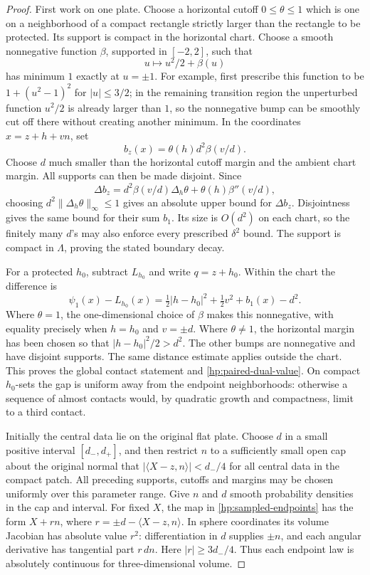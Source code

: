 \documentclass[11pt]{article}
\numberwithin{equation}{section}
\theoremstyle{definition}
\theoremstyle{remark}
\begin{document}
\begin{proof}
First work on one plate.  Choose a horizontal cutoff $0\leq\theta\leq1$
which is one on a neighborhood of a compact rectangle strictly larger
than the rectangle to be protected.  Its support is compact in the
horizontal chart.  Choose a smooth nonnegative function $\beta$,
supported in $[-2,2]$, such that
\[
 u\longmapsto u^2/2+\beta(u)
\]
has minimum $1$ exactly at $u=\pm1$.  For example, first prescribe this
function to be $1+(u^2-1)^2$ for $|u|\leq3/2$; in the remaining
transition region the unperturbed function $u^2/2$ is already larger
than $1$, so the nonnegative bump can be smoothly cut off there without
creating another minimum.  In the coordinates $x=z+h+vn$, set
\begin{equation}\label{hp:well-formula}
 b_z(x)=\theta(h)d^2\beta(v/d).
\end{equation}
Choose $d$ much smaller than the horizontal cutoff margin and the
ambient chart margin.  All supports can then be made disjoint.  Since
\[
 \Delta b_z=d^2\beta(v/d)\Delta_h\theta+
                     \theta(h)\beta''(v/d),
\]
choosing $d^2\|\Delta_h\theta\|_\infty\leq1$ gives an absolute upper
bound for $\Delta b_z$.  Disjointness gives the same bound for their
sum $b_1$.  Its size is $O(d^2)$ on each chart, so the finitely many
$d$'s may also enforce every prescribed $\delta^2$ bound.  The support
is compact in $\Lambda$, proving the stated boundary decay.

For a protected $h_0$, subtract $L_{h_0}$ and write $q=z+h_0$.  Within
the chart the difference is
\[
 \psi_1(x)-L_{h_0}(x)
 =\tfrac12|h-h_0|^2+\tfrac12v^2+b_1(x)-d^2.
\]
Where $\theta=1$, the one-dimensional choice of $\beta$ makes this
nonnegative, with equality precisely when $h=h_0$ and $v=\pm d$.
Where $\theta\ne1$, the horizontal margin has been chosen so that
$|h-h_0|^2/2>d^2$.  The other bumps are nonnegative and have disjoint
supports.  The same distance estimate applies outside the chart.
This proves the global contact statement and
\eqref{hp:paired-dual-value}.  On compact $h_0$-sets the gap is
uniform away from the endpoint neighborhoods: otherwise a sequence
of almost contacts would, by quadratic growth and compactness, limit
to a third contact.

Initially the central data lie on the original flat plate.  Choose $d$
in a small positive interval $[d_-,d_+]$, and then restrict $n$ to a
sufficiently small open cap about the original normal that
$|\langle X-z,n\rangle|<d_-/4$ for all central data in the compact
patch.  All preceding supports, cutoffs and margins may be chosen
uniformly over this parameter range.  Give $n$ and $d$ smooth
probability densities in the cap and interval.  For fixed $X$, the map
in \eqref{hp:sampled-endpoints} has the form $X+r n$, where
$r=\pm d-\langle X-z,n\rangle$.  In sphere coordinates its volume
Jacobian has absolute value $r^2$: differentiation in $d$ supplies
$\pm n$, and each angular derivative has tangential part $r\,dn$.
Here $|r|\geq3d_-/4$.  Thus each endpoint law is absolutely continuous
for three-dimensional volume.


\end{proof}
\end{document}
